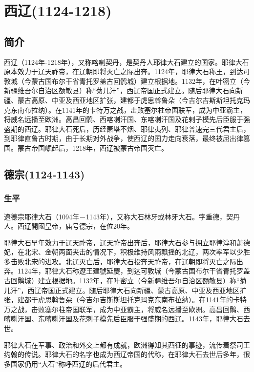 
\section{西辽\tiny(1124-1218)}

\subsection{简介}

西辽（1124年-1218年），又称喀喇契丹，是契丹人耶律大石建立的国家。耶律大石原本效力于辽天祚帝，在辽朝即将灭亡之际出奔。1124年，耶律大石称王，到达可敦城（今蒙古国布尔干省青托罗盖古回鹘城）建立根据地。1132年，在叶密立（今新疆维吾尔自治区额敏县）称“菊儿汗”，西辽帝国正式建立。随后耶律大石向新疆、蒙古高原、中亚及西亚地区扩张，建都于虎思斡鲁朵（今吉尔吉斯斯坦托克玛克东南布拉纳）。在1141年的卡特万之战，击败塞尔柱帝国联军，成为中亚霸主，将威名远播至欧洲。高昌回鹘、西喀喇汗国、东喀喇汗国及花剌子模先后臣服于强盛期的西辽。耶律大石死后，历经萧塔不烟、耶律夷列、耶律普速完三代君主后，到耶律直鲁古时期，由于长期对外战争，使西辽的国力走向衰落，最终被屈出律篡国。蒙古帝国崛起后，1218年，西辽被蒙古帝国灭亡。

\subsection{德宗\tiny(1124-1143)}

\subsubsection{生平}

遼德宗耶律大石（1094年－1143年），又称大石林牙或林牙大石。字重德，契丹人。西辽開國皇帝，庙号德宗，在位20年。

耶律大石早年效力于辽天祚帝，辽天祚帝出奔后，耶律大石参与拥立耶律淳和萧德妃，在北宋、金朝两面夹击的情况下，积极维持风雨飘摇的北辽，两次率军以少胜多击败北宋的进攻。北辽灭亡后，耶律大石投奔天祚帝，在辽朝即将灭亡之际出奔。1124年，耶律大石称遼王建號延慶，到达可敦城（今蒙古国布尔干省青托罗盖古回鹘城）建立根据地。1132年，在叶密立（今新疆维吾尔自治区额敏县）称“菊儿汗”，西辽帝国正式建立。随后耶律大石向新疆、蒙古高原、中亚及西亚地区扩张，建都于虎思斡鲁朵（今吉尔吉斯斯坦托克玛克东南布拉纳）。在1141年的卡特万之战，击败塞尔柱帝国联军，成为中亚霸主，将威名远播至欧洲。高昌回鹘、西喀喇汗国、东喀喇汗国及花剌子模先后臣服于强盛期的西辽。1143年，耶律大石去世。

耶律大石在军事、政治和外交上都有成就，欧洲得知其西征的事迹，流传着祭司王约翰的传说。耶律大石的名字也成为西辽帝国的代称，在耶律大石去世后多年，很多国家仍用“大石”称呼西辽的后代君主。

